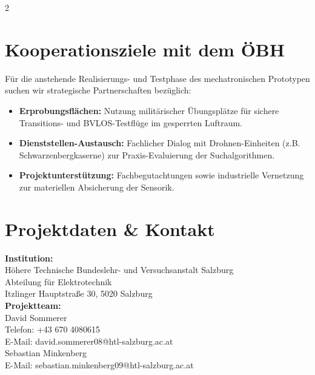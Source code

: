 \documentclass[10pt,a4paper]{article}
\begin{document}
\begin{multicols}{2}

\section{Kooperationsziele mit dem ÖBH}
Für die anstehende Realisierungs- und Testphase des mechatronischen Prototypen suchen wir strategische Partnerschaften bezüglich:
\begin{itemize}
    \item \textbf{Erprobungsflächen:} Nutzung militärischer Übungsplätze für sichere Transitions- und BVLOS-Testflüge im gesperrten Luftraum.
    \item \textbf{Dienststellen-Austausch:} Fachlicher Dialog mit Drohnen-Einheiten (z.B. Schwarzenbergkaserne) zur Praxis-Evaluierung der Suchalgorithmen.
    \item \textbf{Projektunterstützung:} Fachbegutachtungen sowie industrielle Vernetzung zur materiellen Absicherung der Sensorik.
\end{itemize}

\section{Projektdaten \& Kontakt}
\textbf{Institution:} \\
Höhere Technische Bundeslehr- und Versuchsanstalt Salzburg \\
Abteilung für Elektrotechnik \\
Itzlinger Hauptstraße 30, 5020 Salzburg \\

\vspace{0.1cm}
\textbf{Projektteam:} \\
David Sommerer \\
Telefon: +43 670 4080615 \\
E-Mail: david.sommerer08@htl-salzburg.ac.at \\

Sebastian Minkenberg \\
E-Mail: sebastian.minkenberg09@htl-salzburg.ac.at \\

\end{multicols}
\end{document}
